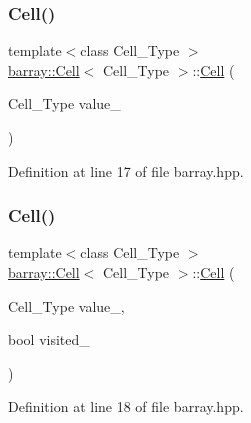 \mbox{\label{classbarray_1_1_cell_a87140a0f48bebf40f5b78fed71e16494}} 
\subsubsection{\texorpdfstring{Cell()}{Cell()}\hspace{0.1cm}{\footnotesize\ttfamily [2/6]}}
{\footnotesize\ttfamily template$<$class Cell\+\_\+\+Type $>$ \\
\hyperlink{classbarray_1_1_cell}{barray\+::\+Cell}$<$ Cell\+\_\+\+Type $>$\+::\hyperlink{classbarray_1_1_cell}{Cell} (\begin{DoxyParamCaption}\item[{Cell\+\_\+\+Type}]{value\+\_\+ }\end{DoxyParamCaption})\hspace{0.3cm}{\ttfamily [inline]}}



Definition at line 17 of file barray.\+hpp.

\mbox{\label{classbarray_1_1_cell_af3b0a20d0f83e48635840e0e184274c1}} 
\subsubsection{\texorpdfstring{Cell()}{Cell()}\hspace{0.1cm}{\footnotesize\ttfamily [3/6]}}
{\footnotesize\ttfamily template$<$class Cell\+\_\+\+Type $>$ \\
\hyperlink{classbarray_1_1_cell}{barray\+::\+Cell}$<$ Cell\+\_\+\+Type $>$\+::\hyperlink{classbarray_1_1_cell}{Cell} (\begin{DoxyParamCaption}\item[{Cell\+\_\+\+Type}]{value\+\_\+,  }\item[{bool}]{visited\+\_\+ }\end{DoxyParamCaption})\hspace{0.3cm}{\ttfamily [inline]}}



Definition at line 18 of file barray.\+hpp.

\mbox{\label{classbarray_1_1_cell_a8094605818f0e830b96f6387720ce121}} 
